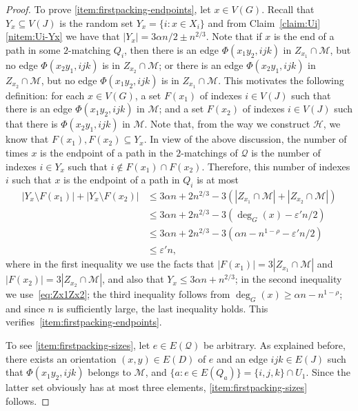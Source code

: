 \documentclass[a4paper, 11pt,reqno]{amsart}
\newcommand{\calH}{\mathcal{H}}
\newcommand{\calM}{\mathcal{M}}
\newcommand{\calQ}{\mathcal{Q}}
\theoremstyle{plain}
\theoremstyle{definition}
\numberwithin{equation}{section}
\newcommand{\eps}{\varepsilon}
\begin{document}
\begin{proof}
To prove \ref{item:firstpacking-endpoints}, let $x\in V(G)$. Recall 
that $Y_x\subseteq V(J)$ is the random set $Y_x = \{i : x\in X_i\}$ and 
from Claim~\ref{claim:Ui}\ref{nitem:Ui-Yx} we have that $|Y_x| = 3\alpha n/2 \pm n^{2/3}$. 
Note that if $x$ is the end of a path in some $2$-matching $Q_i$, 
then there is an edge $\Phi(x_1 y_2, ijk)$ in $Z_{x_1} \cap \calM$, 
but no edge $\Phi(x_2y_1, ijk)$ is in $Z_{x_2} \cap \calM$; 
or there is an edge $\Phi(x_2 y_1, ijk)$ in $Z_{x_2} \cap \calM$, 
but no edge $\Phi(x_1y_2, ijk)$ is in $Z_{x_1} \cap \calM$.  
This motivates the following definition: for each $x\in V(G)$, 
a set $F(x_1)$ of indexes $i\in V(J)$ such that there is an
edge $\Phi(x_1y_2,ijk)$ in $\calM$; and a set $F(x_2)$ of indexes
$i\in V(J)$ such that there is $\Phi(x_2y_1,ijk)$ in $\calM$.  
Note that, from the way we construct $\calH$, we know that 
$F(x_1),F(x_2) \subseteq Y_x$.  In view of the above discussion, 
the number of times $x$ is the endpoint of a path in the $2$-matchings 
of $\calQ$ is the number of indexes $i\in Y_x$ such that 
$i\notin F(x_1)\cap F(x_2)$. Therefore, this number of indexes $i$ 
such that $x$ is the endpoint of a path in $Q_i$ is at most
\begin{align*}
|Y_x\setminus F(x_1)|+|Y_x\setminus F(x_2)|
&\leq 3\alpha n + 2n^{2/3} - 3(|Z_{x_1}\cap\calM| +
|Z_{x_2}\cap\calM|)\\
&\leq 3\alpha n + 2n^{2/3} - 3(\deg_G(x)-\eps'n/2)\\
&\leq 3\alpha n + 2n^{2/3} - 3(\alpha n - n^{1-\rho}-\eps'n/2)\\
&\leq \eps'n,
\end{align*}
where in the first inequality we use the facts that $|F(x_1)| =
3|Z_{x_1}\cap\calM|$ and $|F(x_2)| = 3|Z_{x_2}\cap \calM|$, and also
that $Y_x \leq 3\alpha n + n^{2/3}$; in the second inequality we
use~\eqref{eq:Zx1Zx2}; the third inequality follows from
$\deg_G(x)\geq \alpha n - n^{1-\rho}$; and since $n$ is sufficiently
large, the last inequality holds. This
verifies~\ref{item:firstpacking-endpoints}.

To see \ref{item:firstpacking-sizes}, let $e \in E(\mathcal{Q})$ be arbitrary.
As explained before, there exists an orientation $(x,y) \in E(D)$ of $e$ and an edge $ijk \in E(J)$ such that $\Phi(x_1 y_2, ijk)$ belongs to $\calM$, and $\{ a: e \in E(Q_a) \} = \{i, j, k\} \cap U_1$.
Since the latter set obviously has at most three elements, \ref{item:firstpacking-sizes} follows. 


\end{proof}
\end{document}

